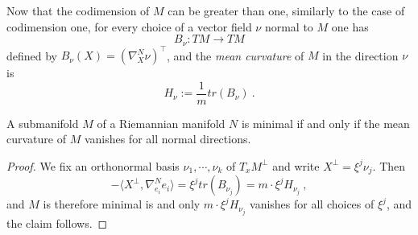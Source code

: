 Now that the codimension of $M$ can be greater than one, similarly to the case of codimension one, for every choice of a vector field $\nu$ normal to $M$ one has
\[
    B_\nu : TM \to TM
\]
defined by $B_\nu(X) = (\nabla^N_X \nu)^\top$, and the \textit{mean curvature} of $M$ in the direction $\nu$ is
\[
    H_\nu := \frac{1}{m} tr(B_\nu) \ .
\]
\begin{theorem}
    A submanifold $M$ of a Riemannian manifold $N$ is minimal if and only if the mean curvature of $M$ vanishes for all normal directions.
\end{theorem}
\begin{proof}
    We fix an orthonormal basis $\nu_1 , \cdots, \nu_k$ of $T_x M^\perp$ and write $X^\perp = \xi^j \nu_j$.
    Then
    \[
        -\langle X^\perp , \nabla^N_{e_i} e_i \rangle = \xi^j tr(B_{\nu_j}) = m \cdot \xi^j H_{\nu_j} \ ,
    \]
    and $M$ is therefore minimal is and only $m \cdot \xi^j H_{\nu_j}$ vanishes for all choices of $\xi^j$, and the claim follows.
\end{proof}

